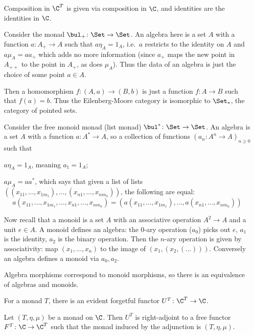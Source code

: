     Composition in $\C^T$ is given via composition in $\C$, and identities are the identities in $\C$.

\edefn

\bexam

    \benum
        \item Consider the monad $\bul_+\colon\Set\to\Set$.
        An algebra here is a set $A$ with a function $a\colon A_+\to A$ such that $a\eta_A=1_A$, i.e.\ $a$ restricts to the identity on $A$ and
        $a\mu_A=aa_+$ which adds no more information (since $a_+$ maps the new point in $A_{++}$ to the point in $A_+$, as does $\mu_A$).
        Thus the data of an algebra is just the choice of some point $a\in A$.

        Then a homomorphism $f\colon(A,a)\to(B,b)$ is just a function $f\colon A\to B$ such that $f(a)=b$.
        Thus the Eilenberg-Moore category is isomorphic to $\Set_*$, the category of pointed sets.

        \item Consider the free monoid monad (list monad) $\bul^*\colon\Set\to\Set$.
        An algebra is a set $A$ with a function $a\colon A^*\to A$, so a collection of functions $(a_n\colon A^n\to A)_{n\geq0}$ such that
        \benum
            \item $a\eta_A=1_A$, meaning $a_1=1_A$;
            \item $a\mu_A=aa^*$, which says that given a list of lists $((x_{11},\dots,x_{1m_1}),\dots,(x_{n1},\dots,x_{nm_n}))$, the following are equal:
            $$ a(x_{11},\dots,x_{1m_1},\dots,x_{n1},\dots,x_{nm_n}) = (a(x_{11},\dots,x_{1m_1}),\dots,a(x_{n1},\dots,x_{nm_n})) $$
        \eenum

        Now recall that a monoid is a set $A$ with an associative operation $A^2\to A$ and a unit $e\in A$.
        A monoid defines an algebra: the $0$-ary operation ($a_0$) picks out $e$, $a_1$ is the identity, $a_2$ is the binary operation.
        Then the $n$-ary operation is given by associativity: map $(x_1,\dots,x_n)$ to the image of $(x_1,(x_2,(\dots)))$.
        Conversely an algebra defines a monoid via $a_0,a_2$.

        Algebra morphisms correspond to monoid morphisms, so there is an equivalence of algebras and monoids.
    \eenum

\eexam

For a monad $T$, there is an evident forgetful functor $U^T\colon\C^T\to\C$.

\blemm

    Let $(T,\eta,\mu)$ be a monad on $\C$.
    Then $U^T$ is right-adjoint to a free functor $F^T\colon\C\to\C^T$ such that the monad induced by the adjunction is $(T,\eta,\mu)$.

